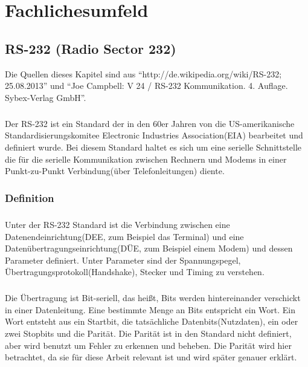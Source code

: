 \chapter{Fachlichesumfeld}\label{chp:fachlichesumfeld}

\section{RS-232 (Radio Sector 232)}

Die Quellen dieses Kapitel sind aus "`http://de.wikipedia.org/wiki/RS-232; 25.08.2013"' und "`Joe Campbell: V 24 / RS-232 Kommunikation. 4. Auflage. Sybex-Verlag GmbH"'.

\paragraph{}
Der RS-232 ist ein Standard der in den 60er Jahren von die US-amerikanische Standardisierungskomitee Electronic Industries Association(EIA) bearbeitet und definiert wurde. Bei diesem Standard haltet es sich um eine serielle Schnittstelle die für die serielle Kommunikation zwischen Rechnern und Modems in einer Punkt-zu-Punkt Verbindung(über Telefonleitungen) diente.


\subsection{Definition}
\paragraph{}
Unter der RS-232 Standard ist die Verbindung zwischen eine Datenendeinrichtung(DEE, zum Beispiel das Terminal) und eine Datenübertragungseinrichtung(DÜE, zum Beispiel einem Modem) und dessen Parameter definiert. Unter Parameter sind der Spannungspegel, Übertragungsprotokoll(Handshake), Stecker und Timing zu verstehen.

\paragraph{}
Die Übertragung ist Bit-seriell, das heißt, Bits werden hintereinander verschickt in einer Datenleitung. Eine bestimmte Menge an Bits entspricht ein Wort. Ein Wort entsteht aus ein Startbit, die tatsächliche Datenbits(Nutzdaten), ein oder zwei Stopbits und die Parität. Die Parität ist in den Standard nicht definiert, aber wird benutzt um Fehler zu erkennen und beheben. Die Parität wird hier betrachtet, da sie für diese Arbeit relevant ist und wird später genauer erklärt.

